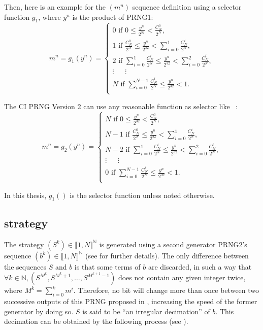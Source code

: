 Then, here is an example for the $(m^n)$ sequence definition using a selector function $g_1$, where $y^n$ is the product of PRNG1:
\begin{equation}
\label{v2_g1}
m^n = g_1(y^n)=
\left\{
\begin{array}{l}
0 \text{ if }0 \leqslant\frac{y^n}{2^{32}}<\frac{C^0_N}{2^N},\\
1 \text{ if }\frac{C^0_N}{2^N} \leqslant\frac{y^n}{2^{32}}<\sum_{i=0}^1\frac{C^i_N}{2^N},\\
2 \text{ if }\sum_{i=0}^1\frac{C^i_N}{2^N} \leqslant\frac{y^n}{2^{32}}<\sum_{i=0}^2\frac{C^i_N}{2^N},\\
\vdots~~~~~ ~~\vdots~~~ ~~~~\\
N \text{ if }\sum_{i=0}^{N-1}\frac{C^i_N}{2^N} \leqslant\frac{y^n}{2^{32}}<1.\\
\end{array}
\right.
\end{equation}

The CI PRNG Version 2 can use any reasonable function as selector like ~\cite{bibtexwangqianxue}:
\begin{equation}
\label{v2_g2}
m^n = g_2(y^n)=
\left\{
\begin{array}{l}
N \text{ if }0 \leqslant\frac{y^n}{2^{32}}<\frac{C^0_N}{2^N},\\
N-1 \text{ if }\frac{C^0_N}{2^N} \leqslant\frac{y^n}{2^{32}}<\sum_{i=0}^1\frac{C^i_N}{2^N},\\
N-2 \text{ if }\sum_{i=0}^1\frac{C^i_N}{2^N} \leqslant\frac{y^n}{2^{32}}<\sum_{i=0}^2\frac{C^i_N}{2^N},\\
\vdots~~~~~ ~~\vdots~~~ ~~~~\\
0 \text{ if }\sum_{i=0}^{N-1}\frac{C^i_N}{2^N} \leqslant\frac{y^n}{2^{32}}<1.\\
\end{array}
\right.
\end{equation}

In this thesis, $g_1()$ is the selector function unless noted otherwise. 


\subsection{strategy}
\label{Chaotic strategy}
The strategy $(S^k) \in \llbracket 1, N \rrbracket^\mathds{N}$ is generated using a second generator PRNG2's sequence $(b^k) \in \llbracket 1, N \rrbracket^\mathds{N}$ (see \cite{Bahi2000} for further details). The only difference between the sequences $S$ and $b$ is that some terms of $b$ are discarded, in such a way that $\forall k \in \mathds{N}, (S^{M^k}, S^{M^k+1}, \hdots, S^{M^{k+1}-1})$ does not contain any given integer twice, where $M^k = \sum_{i=0}^k m^i$. Therefore, no bit will change more than once between two successive outputs of this PRNG proposed in \cite{wbg10:ip}, increasing the speed of the former generator by doing so. $S$ is said to be ``an irregular decimation'' of $b$. This decimation can be obtained by the following process (see \cite{wbg10:ip}).

